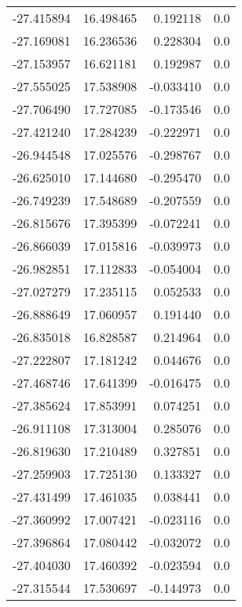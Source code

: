 \begin{tabular}{rrrr}
      -27.415894 &        16.498465 &    0.192118 &   0.0 \\
      -27.169081 &        16.236536 &    0.228304 &   0.0 \\
      -27.153957 &        16.621181 &    0.192987 &   0.0 \\
      -27.555025 &        17.538908 &   -0.033410 &   0.0 \\
      -27.706490 &        17.727085 &   -0.173546 &   0.0 \\
      -27.421240 &        17.284239 &   -0.222971 &   0.0 \\
      -26.944548 &        17.025576 &   -0.298767 &   0.0 \\
      -26.625010 &        17.144680 &   -0.295470 &   0.0 \\
      -26.749239 &        17.548689 &   -0.207559 &   0.0 \\
      -26.815676 &        17.395399 &   -0.072241 &   0.0 \\
      -26.866039 &        17.015816 &   -0.039973 &   0.0 \\
      -26.982851 &        17.112833 &   -0.054004 &   0.0 \\
      -27.027279 &        17.235115 &    0.052533 &   0.0 \\
      -26.888649 &        17.060957 &    0.191440 &   0.0 \\
      -26.835018 &        16.828587 &    0.214964 &   0.0 \\
      -27.222807 &        17.181242 &    0.044676 &   0.0 \\
      -27.468746 &        17.641399 &   -0.016475 &   0.0 \\
      -27.385624 &        17.853991 &    0.074251 &   0.0 \\
      -26.911108 &        17.313004 &    0.285076 &   0.0 \\
      -26.819630 &        17.210489 &    0.327851 &   0.0 \\
      -27.259903 &        17.725130 &    0.133327 &   0.0 \\
      -27.431499 &        17.461035 &    0.038441 &   0.0 \\
      -27.360992 &        17.007421 &   -0.023116 &   0.0 \\
      -27.396864 &        17.080442 &   -0.032072 &   0.0 \\
      -27.404030 &        17.460392 &   -0.023594 &   0.0 \\
      -27.315544 &        17.530697 &   -0.144973 &   0.0 \\

\end{tabular}
